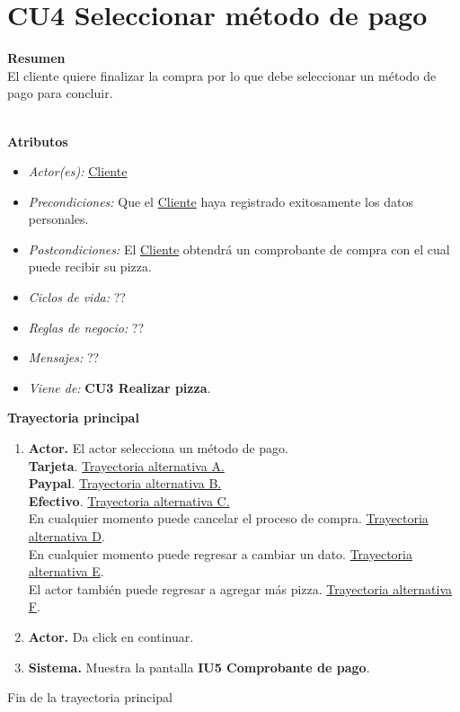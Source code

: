 \hypertarget{CU4}{}
\section{CU4 Seleccionar método de pago}

\noindent \textbf{Resumen}\\

El cliente quiere finalizar la compra por lo que debe seleccionar un método de pago para concluir.

\noindent \textbf{\\Atributos}

\begin{itemize}
	
	\item \textit{Actor(es):} \hyperlink{A:Cliente}{Cliente}
	\item \textit{Precondiciones:} Que el \hyperlink{A:Cliente}{Cliente} haya registrado exitosamente los datos personales.
	\item \textit{Postcondiciones:} El \hyperlink{A:Cliente}{Cliente} obtendrá un comprobante de compra con el cual puede recibir su pizza.
	\item \textit{Ciclos de vida:} ?? 
	\item \textit{Reglas de negocio:} ??
	\item \textit{Mensajes:} ??
	\item \textit{Viene de:} \textbf{CU3 Realizar pizza}.
	
\end{itemize} 

\noindent \textbf{Trayectoria principal}

\begin{enumerate}
	\item {\textbf{Actor.}} El actor selecciona un método de pago.
	\\ \textbf{Tarjeta}. \hyperlink{TAA:CU4}{Trayectoria alternativa A.} 
	\\ \textbf{Paypal}. \hyperlink{TAB:CU4}{Trayectoria alternativa B.}
	\\ \textbf{Efectivo}. \hyperlink{TAC:CU4}{Trayectoria alternativa C.}
	\\ En cualquier momento puede cancelar el proceso de compra. \hyperlink{TAD:CU3}{Trayectoria alternativa D}.
	\\ En cualquier momento puede regresar a cambiar un dato. \hyperlink{TAE:CU3}{Trayectoria alternativa E}.
	\\ El actor también puede regresar a agregar más pizza. \hyperlink{TAF:CU3}{Trayectoria alternativa F}.

	
	\item {\textbf{Actor.}} \hypertarget{p5}{}Da click en continuar.
	
	\item \textbf{Sistema.} \hypertarget{p6}{}Muestra la pantalla \textbf{IU5 Comprobante de pago}.
		
\end{enumerate}	
Fin de la trayectoria principal
\\

